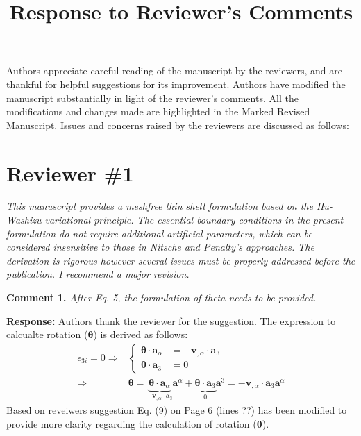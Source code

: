 \documentclass{article}
\title{Response to Reviewer's Comments}
\author{}
\date{}
\begin{document}
\maketitle

Authors appreciate careful reading of the manuscript by the reviewers, and are thankful for helpful suggestions for its improvement. Authors have modified the manuscript substantially in light of the reviewer's comments. All the modifications and changes made are highlighted in the Marked Revised Manuscript. Issues and concerns raised by the reviewers are discussed as follows:

\section*{Reviewer \#1}
\textit{This manuscript provides a meshfree thin shell formulation based on the Hu-Washizu variational principle. The essential boundary conditions in the present formulation do not require additional artificial parameters, which can be considered insensitive to those in Nitsche and Penalty’s approaches. The derivation is rigorous however several issues must be properly addressed before the publication. I recommend a major revision.}

\textbf{Comment 1.} \textit{After Eq. 5, the formulation of theta needs to be provided.}

\textbf{Response:} Authors thank the reviewer for the suggestion. The expression to calcualte rotation ($\boldsymbol \theta$) is derived as follows:
\begin{equation}
    \begin{split}
        \epsilon_{3i} = 0 \Rightarrow &
        \left \{
        \begin{split}
            \boldsymbol \theta \cdot \boldsymbol a_\alpha &= - \boldsymbol v_{,\alpha} \cdot \boldsymbol a_3 \\
            \boldsymbol \theta \cdot \boldsymbol a_3 &= 0
        \end{split}
        \right . \\ \Rightarrow &
        \boldsymbol \theta = \underbrace{\boldsymbol \theta \cdot \boldsymbol a_{\alpha}}_{- \boldsymbol v_{,\alpha} \cdot \boldsymbol a_3} \boldsymbol a^\alpha 
        + \underbrace{\boldsymbol \theta \cdot \boldsymbol a_3}_{0} \boldsymbol a^3 = - \boldsymbol v_{,\alpha} \cdot \boldsymbol a_3 \boldsymbol a^\alpha
    \end{split}
\end{equation}
Based on reveiwers suggestion Eq. (9) on Page 6 (lines ??) has been modified to provide more clarity regarding the calculation of rotation ($\boldsymbol \theta$).
\end{document}
